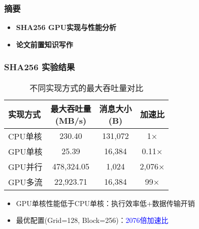 \documentclass[slide]{../../custom}
\begin{document}
\begin{frame}
  \titlepage
\end{frame}

\begin{frame}
  \frametitle{摘要}
  \begin{itemize}
    \item \textbf{SHA256 GPU实现与性能分析}
    \item \textbf{论文前置知识写作}
  \end{itemize}
\end{frame}

\begin{frame}
  \frametitle{SHA256 实验结果}
  \begin{table}
    \centering
    \caption{不同实现方式的最大吞吐量对比}
    \begin{tabular}{|l|c|c|c|}
      \hline
      实现方式 & \makecell{最大吞吐量\\(MB/s)} & \makecell{消息大小\\(B)} & 加速比 \\
      \hline
      CPU单核 \cite{Wang2025} & 230.40 & 131,072 & 1× \\
      GPU单核 \cite{Wang2025} & 25.39 & 16,384 & 0.11× \\
      \hline
      GPU并行 & 478,324.05 & 1,024 & 2,076× \\
      \hline
      GPU多流 & 22,923.71 & 16,384 & 99× \\
      \hline
    \end{tabular}
  \end{table}

  \begin{itemize}
    \item GPU单核性能低于CPU单核：执行效率低+数据传输开销
    \item 最优配置(Grid=128, Block=256)：\textcolor{blue}{2076倍加速比}
  \end{itemize}
\end{frame}
\end{document}
